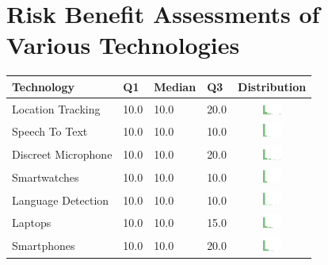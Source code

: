 
\section{Risk Benefit Assessments of Various Technologies}
\label{sec:riskben-appendix} 

\begin{table}[h!!!!]
\begin{center}
\small
\begin{tabular}{| p{2cm} | p{1cm} | p{1cm} | p{1cm} | c |}
\hline
Technology & Q1 &  Median & Q3 & Distribution  \\ 
\hline
Location Tracking & 10.0 & 10.0 & 20.0 & \includegraphics[width = 2cm, height = 0.5cm]{tex-inputs/table-images/locationtrackingrisk} \\ 
Speech To Text & 10.0 & 10.0 & 10.0 & \includegraphics[width = 2cm, height = 0.5cm]{tex-inputs/table-images/speechtotextrisk} \\ 
Discreet Microphone & 10.0 & 10.0 & 20.0 & \includegraphics[width = 2cm, height = 0.5cm]{tex-inputs/table-images/discreetmicrophonerisk} \\ 
Smartwatches & 10.0 & 10.0 & 10.0 & \includegraphics[width = 2cm, height = 0.5cm]{tex-inputs/table-images/smartwatchesrisk} \\ 
Language Detection & 10.0 & 10.0 & 10.0 & \includegraphics[width = 2cm, height = 0.5cm]{tex-inputs/table-images/languagedetectionrisk} \\ 
Laptops & 10.0 & 10.0 & 15.0 & \includegraphics[width = 2cm, height = 0.5cm]{tex-inputs/table-images/laptopsrisk} \\ 
Smartphones & 10.0 & 10.0 & 20.0 & \includegraphics[width = 2cm, height = 0.5cm]{tex-inputs/table-images/smartphonesrisk} \\ 

\end{tabular}
\end{center}
\end{table}
